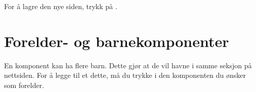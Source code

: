 \begin{figure}[H]
    \centering
    \label{fig:cms-fill-information}
\end{figure}

For å lagre den nye siden, trykk på .

\begin{figure}[H]
    \centering
    \label{fig:cms-add}
\end{figure}

\section{Forelder- og barnekomponenter}
En komponent kan ha flere barn. Dette gjør at de vil havne i samme seksjon på nettsiden. For å legge til et dette, må du trykke  i den komponenten du ønsker som forelder.

\begin{figure}[H]
    \centering
    \label{fig:cms-child}
\end{figure}

